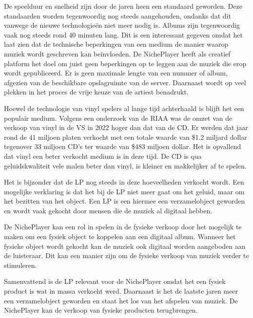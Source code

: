 De speelduur en snelheid zijn door de jaren heen een standaard geworden. Deze standaarden worden tegenwoordig nog steeds aangehouden, ondanks dat dit vanwege de nieuwe technologieën niet meer nodig is. Albums zijn tegenwoordig vaak nog steeds rond 40 minuten lang. Dit is een interessant gegeven omdat het laat zien dat de technische beperkingen van een medium de manier waarop muziek wordt geschreven kan beïnvloeden. De NichePlayer heeft als creatief platform het doel om juist geen beperkingen op te leggen aan de muziek die erop wordt gepubliceerd. Er is geen maximale lengte van een nummer of album, afgezien van de beschikbare opslagruimte van de server. Daarnaast wordt op veel plekken in het proces de vrije keuze van de artiest benadrukt.

Hoewel de technologie van vinyl spelers al lange tijd achterhaald is blijft het een populair medium. Volgens een onderzoek van de RIAA \citep{year_end_2022_RIAA_revenue_statistics} was de omzet van de verkoop van vinyl in de VS in 2022 hoger dan dat van de CD. Er werden dat jaar rond de 41 miljoen platen verkocht met een totale waarde van \$1.2 miljard dollar tegenover 33 miljoen CD's ter waarde van \$483 miljoen dollar. Het is opvallend dat vinyl een beter verkocht medium is in deze tijd. De CD is qua geluidskwaliteit vele malen beter dan vinyl, is kleiner en makkelijker af te spelen.

Het is bijzonder dat de LP nog steeds in deze hoeveelheden verkocht wordt. Een mogelijke verklaring is dat het bij de LP niet meer gaat om het geluid, maar om het bezitten van het object. Een LP is een hiermee een verzamelobject geworden en wordt vaak gekocht door mensen die de muziek al digitaal hebben.

De NichePlayer kan een rol in spelen in de fysieke verkoop door het mogelijk te maken om een fysiek object te koppelen aan een digitaal album. Wanneer het fysieke object wordt gekocht kan de muziek ook digitaal worden aangeboden aan de luisteraar. Dit kan een manier zijn om de fysieke verkoop van muziek verder te stimuleren.

Samenvattend is de LP relevant voor de NichePlayer omdat het een fysiek product is wat in massa verkocht werd. Daarnaast is het de laatste jaren meer een verzamelobject geworden en staat het los van het afspelen van muziek. De NichePlayer kan de verkoop van fysieke producten terugbrengen.

